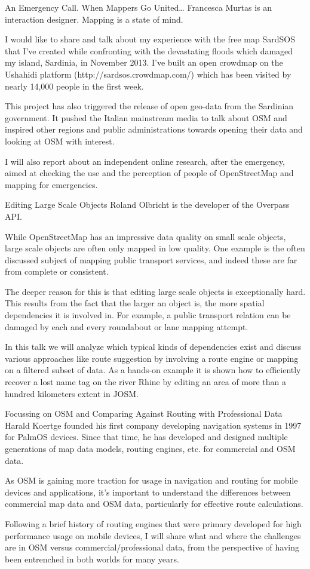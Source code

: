 %
{An Emergency Call. When Mappers Go United\dots}%
{Francesca Murtas is an interaction designer. Mapping is a state of mind.}%
{I would like to share and talk about my experience with the free map SardSOS that I've created while confronting with the devastating floods which damaged my island, Sardinia, in November 2013. I've built an open crowdmap on the Ushahidi platform (http://sardsos.crowdmap.com/) which has been visited by nearly 14,000 people in the first week.

This project has also triggered the release of open geo-data from the Sardinian government. It pushed the Italian mainstream media to talk about OSM and inspired other regions and public administrations towards opening their data and looking at OSM with interest.

I will also report about an independent online research, after the emergency, aimed at checking the use and the perception of people of OpenStreetMap and mapping for emergencies.}

%
{Editing Large Scale Objects}%
{Roland Olbricht is the developer of the Overpass API.}%
{While OpenStreetMap has an impressive data quality on small scale objects, large scale objects are often only mapped in low quality. One example is the often discussed subject of mapping public transport services, and indeed these are far from complete or consistent.

The deeper reason for this is that editing large scale objects is exceptionally hard. This results from the fact that the larger an object is, the more spatial dependencies it is involved in. For example, a public transport relation can be damaged by each and every roundabout or lane mapping attempt.

In this talk we will analyze which typical kinds of dependencies exist and discuss various approaches like route suggestion by involving a route engine or mapping on a filtered subset of data. As a hands-on example it is shown how to efficiently recover a lost name tag on the river Rhine by editing an area of more than a hundred kilometers extent in JOSM.}

%
{Focussing on OSM and Comparing Against Routing with Professional Data}%
{Harald Koertge founded his first company developing navigation systems in 1997 for PalmOS devices. Since that time, he has developed and designed multiple generations of map data models, routing engines, etc. for commercial and OSM data.}%
{As OSM is gaining more traction for usage in navigation and routing for mobile devices and applications, it’s important to understand the differences between commercial map data and OSM data, particularly for effective route calculations. 

Following a brief history of routing engines that were primary developed for high performance usage on mobile devices, I will share what and where the challenges are in OSM versus commercial/professional data, from the perspective of having been entrenched in both worlds for many years.}


